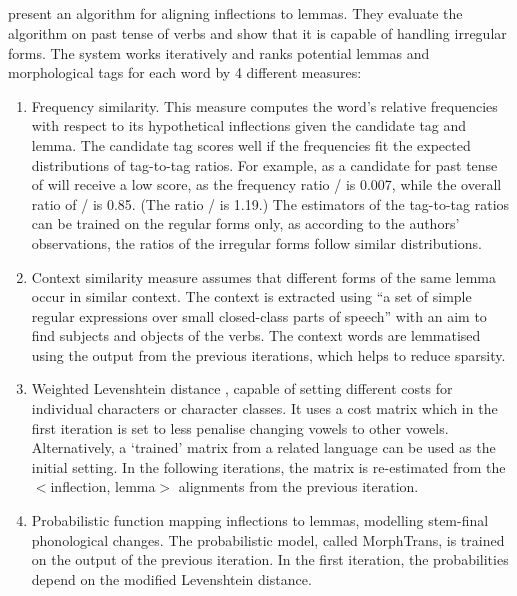 \subsection[Yarowsky and Wicentowski (2000)]{\cite{yarowsky00}}\label{y_and_w}
\cite{yarowsky00} present an algorithm for aligning inflections to lemmas. They evaluate the algorithm on past tense of verbs and show that it is capable of handling irregular forms. The system works iteratively and ranks potential lemmas and morphological tags for each word by 4 different measures:
\begin{enumerate}
\item Frequency similarity. This measure computes the word's relative frequencies with respect to its hypothetical inflections given the candidate tag and lemma. The candidate tag scores well if the frequencies fit the expected distributions of tag-to-tag ratios. For example,  as a candidate for past tense of  will receive a low score, as the frequency ratio / is 0.007, while the overall ratio of / is 0.85. (The ratio / is 1.19.) The estimators of the tag-to-tag ratios can be trained on the regular forms only, as according to the authors' observations, the ratios of the irregular forms follow similar distributions.

\item Context similarity measure assumes that different forms of the same lemma occur in similar context. The context is extracted using ``a set of simple regular expressions over small closed-class parts of speech'' with an aim to find subjects and objects of the verbs. The context words are lemmatised using the output from the previous iterations, which helps to reduce sparsity.

\item Weighted Levenshtein distance \citep{levenshtein66}, capable of setting different costs for individual characters or character classes. It uses a cost matrix which in the first iteration is set to less penalise changing vowels to other vowels. Alternatively, a `trained' matrix from a related language can be used as the initial setting. In the following iterations, the matrix is re-estimated from the $<$inflection, lemma$>$ alignments from the previous iteration. 

\item Probabilistic function mapping inflections to lemmas, modelling stem-final pho\-nological changes. The probabilistic model, called MorphTrans, is trained on the output of the previous iteration. In the first iteration, the probabilities depend on the modified Levenshtein distance.
\end{enumerate}

